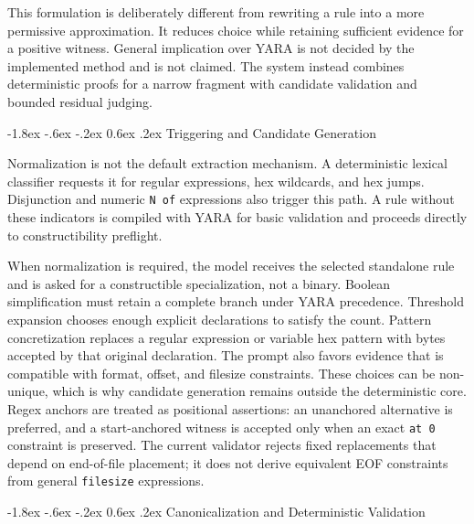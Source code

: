 \documentclass[11pt,twocolumn]{article}
\makeatletter
\newcommand{\code}[1]{\texttt{#1}}
\renewcommand\subsection{\@startsection{subsection}{2}{\z@}%
  {-1.8ex \@plus -.6ex \@minus -.2ex}%
  {0.6ex \@plus .2ex}%
  {\normalfont\normalsize\bfseries}}
\makeatother
\begin{document}
This formulation is deliberately different from rewriting a rule into a more
permissive approximation. It reduces choice while retaining sufficient evidence
for a positive witness. General implication over YARA is not decided by the
implemented method and is not claimed. The system instead combines deterministic
proofs for a narrow fragment with candidate validation and bounded residual
judging.

\subsection{Triggering and Candidate Generation}

Normalization is not the default extraction mechanism. A deterministic lexical
classifier requests it for regular expressions, hex wildcards, and hex jumps.
Disjunction and numeric \code{N of} expressions also trigger this path. A rule
without these indicators is compiled with YARA for basic validation and proceeds
directly to constructibility preflight.

When normalization is required, the model receives the selected standalone rule
and is asked for a constructible specialization, not a binary. Boolean
simplification must retain a complete branch under YARA precedence. Threshold
expansion chooses enough explicit declarations to satisfy the count. Pattern
concretization replaces a regular expression or variable hex pattern with bytes
accepted by that original declaration. The prompt also favors evidence that is
compatible with format, offset, and filesize constraints. These choices can be
non-unique, which is why candidate generation remains outside the deterministic
core. Regex anchors are treated as positional assertions: an unanchored
alternative is preferred, and a start-anchored witness is accepted only when an
exact \code{at 0} constraint is preserved. The current validator rejects fixed
replacements that depend on end-of-file placement; it does not derive equivalent
EOF constraints from general \code{filesize} expressions.

\subsection{Canonicalization and Deterministic Validation}
\end{document}
